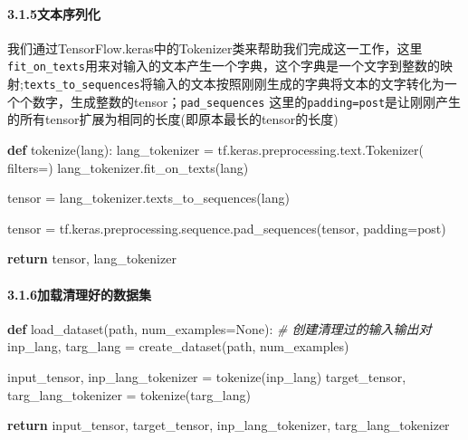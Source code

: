 \documentclass[
]{article}
\newenvironment{Shaded}{}{}
\newcommand{\CommentTok}[1]{\textcolor[rgb]{0.38,0.63,0.69}{\textit{#1}}}
\newcommand{\ControlFlowTok}[1]{\textcolor[rgb]{0.00,0.44,0.13}{\textbf{#1}}}
\newcommand{\KeywordTok}[1]{\textcolor[rgb]{0.00,0.44,0.13}{\textbf{#1}}}
\newcommand{\NormalTok}[1]{#1}
\newcommand{\OperatorTok}[1]{\textcolor[rgb]{0.40,0.40,0.40}{#1}}
\newcommand{\StringTok}[1]{\textcolor[rgb]{0.25,0.44,0.63}{#1}}
\newcommand{\VariableTok}[1]{\textcolor[rgb]{0.10,0.09,0.49}{#1}}
\begin{document}
\hypertarget{header-n104}{%
\paragraph{3.1.5文本序列化}\label{header-n104}}

我们通过TensorFlow.keras中的Tokenizer类来帮助我们完成这一工作，这里
\texttt{fit\_on\_texts}用来对输入的文本产生一个字典，这个字典是一个文字到整数的映射;\texttt{texts\_to\_sequences}将输入的文本按照刚刚生成的字典将文本的文字转化为一个个数字，生成整数的tensor；\texttt{pad\_sequences}
这里的\texttt{padding=\textquotesingle{}post\textquotesingle{}}是让刚刚产生的所有tensor扩展为相同的长度(即原本最长的tensor的长度)

\begin{Shaded}
\begin{Highlighting}[]
\KeywordTok{def}\NormalTok{ tokenize(lang):}
\NormalTok{    lang\_tokenizer }\OperatorTok{=}\NormalTok{ tf.keras.preprocessing.text.Tokenizer(}
\NormalTok{      filters}\OperatorTok{=}\StringTok{\textquotesingle{}\textquotesingle{}}\NormalTok{)}
\NormalTok{    lang\_tokenizer.fit\_on\_texts(lang)}

\NormalTok{    tensor }\OperatorTok{=}\NormalTok{ lang\_tokenizer.texts\_to\_sequences(lang)}

\NormalTok{    tensor }\OperatorTok{=}\NormalTok{ tf.keras.preprocessing.sequence.pad\_sequences(tensor,}
\NormalTok{                                                         padding}\OperatorTok{=}\StringTok{\textquotesingle{}post\textquotesingle{}}\NormalTok{)}

    \ControlFlowTok{return}\NormalTok{ tensor, lang\_tokenizer}
\end{Highlighting}
\end{Shaded}

\hypertarget{header-n108}{%
\paragraph{3.1.6加载清理好的数据集}\label{header-n108}}

\begin{Shaded}
\begin{Highlighting}[]
\KeywordTok{def}\NormalTok{ load\_dataset(path, num\_examples}\OperatorTok{=}\VariableTok{None}\NormalTok{):}
    \CommentTok{\# 创建清理过的输入输出对}
\NormalTok{    inp\_lang, targ\_lang }\OperatorTok{=}\NormalTok{ create\_dataset(path, num\_examples)}

\NormalTok{    input\_tensor, inp\_lang\_tokenizer }\OperatorTok{=}\NormalTok{ tokenize(inp\_lang)}
\NormalTok{    target\_tensor, targ\_lang\_tokenizer }\OperatorTok{=}\NormalTok{ tokenize(targ\_lang)}

    \ControlFlowTok{return}\NormalTok{ input\_tensor, target\_tensor, inp\_lang\_tokenizer, targ\_lang\_tokenizer}
\end{Highlighting}
\end{Shaded}
\end{document}
